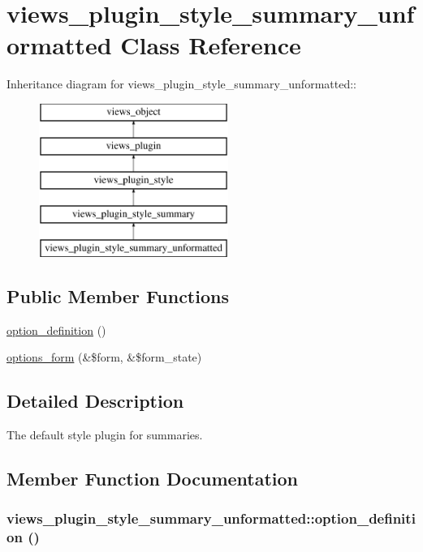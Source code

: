 \hypertarget{classviews__plugin__style__summary__unformatted}{
\section{views\_\-plugin\_\-style\_\-summary\_\-unformatted Class Reference}
\label{classviews__plugin__style__summary__unformatted}
}
Inheritance diagram for views\_\-plugin\_\-style\_\-summary\_\-unformatted::\begin{figure}[H]
\begin{center}
\leavevmode
\includegraphics[height=5cm]{classviews__plugin__style__summary__unformatted}
\end{center}
\end{figure}
\subsection*{Public Member Functions}
\begin{CompactItemize}
\item 
\hyperlink{classviews__plugin__style__summary__unformatted_3bc8b50051e4681461dedb8099f54c24}{option\_\-definition} ()
\item 
\hyperlink{classviews__plugin__style__summary__unformatted_8770285dac047bf88a2c77b2e798826d}{options\_\-form} (\&\$form, \&\$form\_\-state)
\end{CompactItemize}


\subsection{Detailed Description}
The default style plugin for summaries. 

\subsection{Member Function Documentation}
\hypertarget{classviews__plugin__style__summary__unformatted_3bc8b50051e4681461dedb8099f54c24}{
\subsubsection[{option\_\-definition}]{\setlength{\rightskip}{0pt plus 5cm}views\_\-plugin\_\-style\_\-summary\_\-unformatted::option\_\-definition ()}}
\label{classviews__plugin__style__summary__unformatted_3bc8b50051e4681461dedb8099f54c24}


